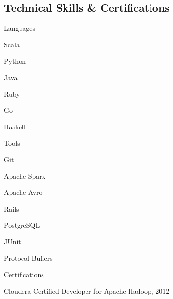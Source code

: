 \documentclass[a4paper,margin,line]{resume}
\begin{document}
\begin{resume}
\section{\mysidestyle Technical Skills \& Certifications}
	\begin{compactdesc}
		\item[Languages] \begin{inparaenum} { \small
            \item Scala
			\item Python
			\item Java
			\item Ruby
			\item Go
            \item Haskell
		} \end{inparaenum}
		\item[Tools] \begin{inparaenum} { \small
			\item Git
            \item Apache Spark
            \item Apache Avro
            \item Rails
            \item PostgreSQL
            \item JUnit
            \item Protocol Buffers
		} \end{inparaenum}
        \item[Certifications] \begin{inparaenum} { \small
            \item Cloudera Certified Developer for Apache Hadoop, 2012    
        } \end{inparaenum}
	\end{compactdesc}


\end{resume}
\end{document}
